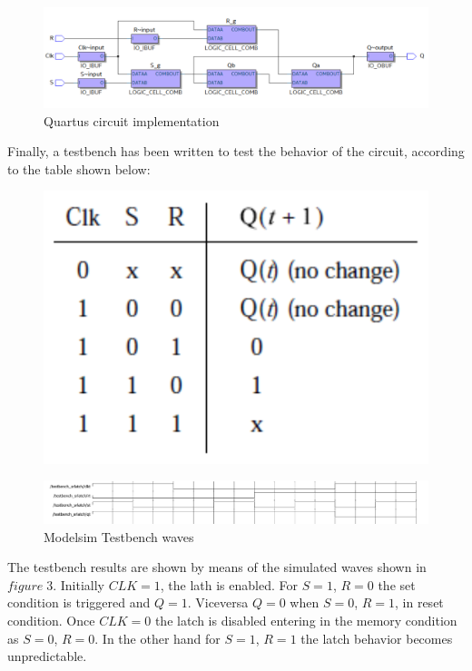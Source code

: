 \documentclass[12pt]{article}
\begin{document}
\begin{figure}[h]
	\centering
	\includegraphics[scale = 0.6]{immagini/postmap.PNG}
	\caption{Quartus circuit implementation}
\end{figure}
\vspace{5mm}
Finally, a testbench has been written to test the behavior of the circuit, according to the table shown below:
\vspace{5mm}
\begin{figure}[h]
	\centering
	\includegraphics[scale = 0.6]{immagini/table_sr.PNG}		
\end{figure}
\newpage


\begin{figure}[h]
	\centering
	\includegraphics[scale = 0.45]{immagini/testbench1.PNG}
	\caption{Modelsim Testbench waves}
\end{figure}
The testbench results are shown by means of the simulated waves shown in $figure\;3$. 
Initially $CLK=1$, the lath is enabled. For $S=1$, $R=0$ the set condition is triggered and $Q=1$. Viceversa $Q=0$ when $S=0$, $R=1$, in reset condition. Once $CLK=0$ the latch is disabled entering in the memory condition as $S=0$, $R=0$. In the other hand for $S=1$, $R=1$ the latch behavior becomes unpredictable.
\vspace{10mm}
\end{document}
